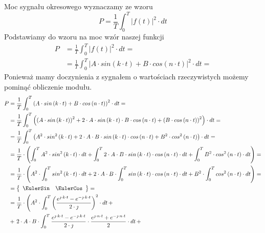 \begin{task}
Moc sygnału okresowego wyznaczamy ze wzoru
\begin{equation}
P=\frac{1}{T}\int_{0}^{T}\left| f(t) \right|^2 \cdot dt
\end{equation}
Podstawiamy do wzoru na moc wzór naszej funkcji
\begin{align*}
P&=\frac{1}{T}\int_{0}^{T}\left|f(t)\right|^2 \cdot dt=\\
 &=\frac{1}{T}\int_{0}^{T}\left| A\cdot sin\left(k \cdot t\right)+B \cdot cos\left(n \cdot t\right) \right|^2 \cdot dt=
\end{align*}
Ponieważ mamy doczynienia z sygnałem o wartościach rzeczywistych możemy pominąć obliczenie modułu.
\begin{align*}
P &=\frac{1}{T}\int_{0}^{T}\left( A\cdot sin\left(k \cdot t\right)+B \cdot cos\left(n \cdot t\right) \right)^2 \cdot dt=\\
&=\frac{1}{T}\int_{0}^{T}\left( \left(A\cdot sin\left(k \cdot t\right) \right)^2 +2 \cdot A\cdot sin\left(k \cdot t\right) \cdot B \cdot cos\left(n \cdot t\right) + \left(B \cdot cos\left(n \cdot t\right) \right)^2\right) \cdot dt=\\
&=\frac{1}{T}\int_{0}^{T}\left( A^2\cdot sin^2\left(k \cdot t\right) +2 \cdot A\cdot B \cdot  sin\left(k \cdot t\right) \cdot cos\left(n \cdot t\right) + B^2 \cdot cos^2\left(n \cdot t\right) \right) \cdot dt=\\
&=\frac{1}{T} \cdot \left( \int_{0}^{T} A^2\cdot sin^2\left(k \cdot t\right)\cdot dt + \int_{0}^{T} 2 \cdot A\cdot B \cdot  sin\left(k \cdot t\right) \cdot cos\left(n \cdot t\right)\cdot dt + \int_{0}^{T} B^2 \cdot cos^2\left(n \cdot t\right) \cdot dt \right)=\\
&=\frac{1}{T} \cdot \left( A^2\cdot \int_{0}^{T} sin^2\left(k \cdot t\right)\cdot dt + 2 \cdot A\cdot B \cdot \int_{0}^{T} sin\left(k \cdot t\right) \cdot cos\left(n \cdot t\right)\cdot dt + B^2 \cdot \int_{0}^{T} cos^2\left(n \cdot t\right) \cdot dt \right)=\\
&=\left\{\begin{array}{ll}
\EulerSin & \EulerCos
\end{array}\right\}=\\
&=\frac{1}{T} \cdot \left( A^2\cdot \int_{0}^{T} \left(\frac{e^{\jmath \cdot k \cdot t}-e^{-\jmath \cdot k \cdot t}}{2\cdot \jmath}\right)^2\cdot dt \,+\right. \\
&+ \left. 2 \cdot A\cdot B \cdot \int_{0}^{T} \frac{e^{\jmath \cdot k \cdot t}-e^{-\jmath \cdot k \cdot t}}{2\cdot \jmath} \cdot \frac{e^{\jmath \cdot n \cdot t}+e^{-\jmath \cdot n \cdot t}}{2} \cdot dt\,+\right.\\

\end{align*}
\end{task}
